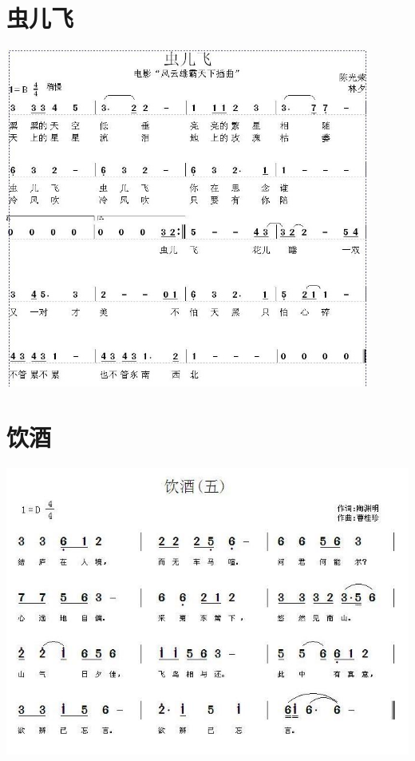 \documentclass[cn,pad,twocol]{elegantbook}
\begin{document}
\section{虫儿飞} \includegraphics[width=0.9\textwidth]{macos/20210208虫儿飞.jpg}
\section{饮酒}                  \includegraphics[width=\textwidth]{dongxiao/20200808-饮酒-陶渊明.jpg}
\end{document}
